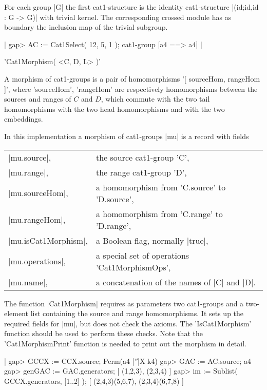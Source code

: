For   each  group |G|    the first  cat1-structure    is the  identity
cat1-structure  |(id;id,id :  G  ->  G)| with   trivial   kernel.  The
corresponding crossed module has as  boundary the inclusion map of the
trivial subgroup.

|    gap> AC := Cat1Select( 12, 5, 1 );
    cat1-group [a4 ==> a4]   |

%

'Cat1Morphism( <C, D, L> )'

A  morphism of cat1-groups is   a pair of  homomorphisms '[ sourceHom,
rangeHom  ]',   where    'sourceHom',  'rangeHom'  are    respectively
homomorphisms between  the sources and   ranges of $C$ and $D$,  which
commute   with   the  two  tail homomorphisms     with  the  two  head
homomorphisms and with the two embeddings.

In this implementation a morphism of cat1-groups |mu| is a record with
fields\:

\begin{tabular}{ll}
|mu.source|,         & the source cat1-group 'C',              \\
|mu.range|,          & the range cat1-group  'D',               \\
|mu.sourceHom|,      & a homomorphism from 'C.source' to 'D.source',\\
|mu.rangeHom|,       & a homomorphism from 'C.range' to 'D.range',  \\
|mu.isCat1Morphism|, & a Boolean flag, normally |true|,             \\
|mu.operations|,     & a special set of operations 'Cat1MorphismOps', \\
|mu.name|,           & a concatenation of the names of |C| and |D|.
\end{tabular}

The function |Cat1Morphism| requires as parameters two cat1-groups and
a two-element list containing the source  and range homomorphisms.  It
sets up the required fields for  |mu|, but does  not check the axioms.
The 'IsCat1Morphism' function should  be used to perform these checks.
Note that the 'Cat1MorphismPrint' function  is needed to print out the
morphism in detail.

|    gap> GCCX := CCX.source;
    Perm(a4 |'\|'|X k4)
    gap> GAC := AC.source;
    a4
    gap> genGAC := GAC.generators;
    [ (1,2,3), (2,3,4) ]
    gap> im := Sublist( GCCX.generators, [1..2] );
    [ (2,4,3)(5,6,7), (2,3,4)(6,7,8) ]

